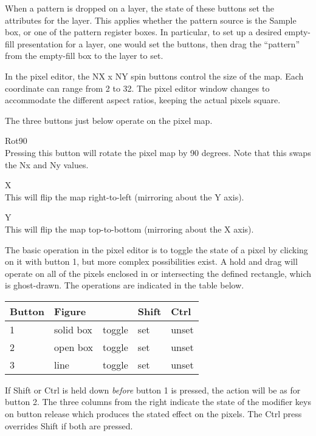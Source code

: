 When a pattern is dropped on a layer, the state of these buttons set
the attributes for the layer.  This applies whether the pattern source
is the {\cb Sample} box, or one of the pattern register boxes.  In
particular, to set up a desired empty-fill presentation for a layer,
one would set the buttons, then drag the ``pattern'' from the
empty-fill box to the layer to set.

In the pixel editor, the {\cb NX x NY} spin buttons control the size
of the map.  Each coordinate can range from 2 to 32.  The pixel editor
window changes to accommodate the different aspect ratios, keeping the
actual pixels square.

The three buttons just below operate on the pixel map.
\begin{description}
\item{\cb Rot90}\\
Pressing this button will rotate the pixel map by 90 degrees.  Note that
this swaps the Nx and Ny values.

\item{\cb X}\\
This will flip the map right-to-left (mirroring about the Y axis).

\item{\cb Y}\\
This will flip the map top-to-bottom (mirroring about the X axis).
\end{description}

The basic operation in the pixel editor is to toggle the state of a
pixel by clicking on it with button 1, but more complex possibilities
exist.  A hold and drag will operate on all of the pixels enclosed in
or intersecting the defined rectangle, which is ghost-drawn.  The
operations are indicated in the table below.

\begin{tabular}{|l|l|l|l|l|} \hline
\bf Button & \bf Figure & & \bf Shift & \bf Ctrl\\ \hline
1 & solid box & toggle & set & unset\\ \hline
2 & open box & toggle & set & unset\\ \hline
3 & line & toggle & set & unset\\ \hline
\end{tabular}

If {\kb Shift} or {\kb Ctrl} is held down {\it before} button 1 is
pressed, the action will be as for button 2.  The three columns from
the right indicate the state of the modifier keys on button release
which produces the stated effect on the pixels.  The {\kb Ctrl} press
overrides {\kb Shift} if both are pressed.


